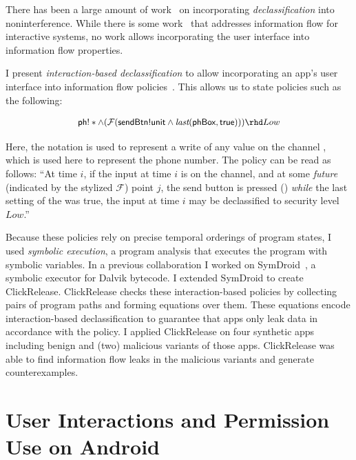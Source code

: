 There has been a large amount of
work~\cite{Sabelfeld:2009,Askarov:2007,Chong:04,Walker:00,Li:05,Sabelfeld:05}
on incorporating \emph{declassification} into noninterference. While
there is some work~\cite{O'Neill:2006,Dimitrova:12} that addresses
information flow for interactive systems, no work allows incorporating
the user interface into information flow properties.

I present \emph{interaction-based declassification} to allow
incorporating an app's user interface into information flow
policies~\cite{micinski:15}. This allows us to state policies such as
the following:

\begin{displaymath} \small
  \begin{array}{cc}
      \code{ph}!\ast \wedge (\tfuture (
      \code{sendBtn!unit} \land
      \tlast{\code{phBox}}{\code{true}})) \rhd Low \\
    \end{array}
\end{displaymath}

Here, the  notation is used to represent a write of any
value on the channel , which is used here to represent the
phone number.  The policy can be read as follows: ``At time $i$, if
the input at time $i$ is on the  channel, and at some
\emph{future} (indicated by the stylized $\mathcal{F}$) point $j$, the
send button is pressed () \emph{while} the last
setting of the  was true, the input at time $i$ may be
declassified to security level $Low$.''

Because these policies rely on precise temporal orderings of program
states, I used \emph{symbolic execution}, a program analysis that
executes the program with symbolic variables. In a previous
collaboration I worked on SymDroid~\cite{Jeon:2012}, a symbolic
executor for Dalvik bytecode. I extended SymDroid to create
ClickRelease. ClickRelease checks these interaction-based policies by
collecting pairs of program paths and forming equations over
them. These equations encode interaction-based declassification to
guarantee that apps only leak data in accordance with the policy. I
applied ClickRelease on four synthetic apps including benign and (two)
malicious variants of those apps. ClickRelease was able to find
information flow leaks in the malicious variants and generate
counterexamples.

\section{User Interactions and Permission Use on Android}

